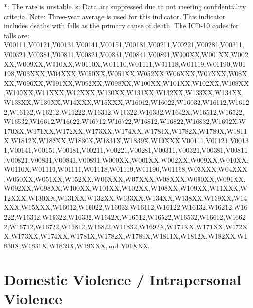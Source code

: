 \documentclass[
  english,
  letterpaper,
]{report}
\begin{document}
\begin{tcolorbox}[enhanced jigsaw, breakable, leftrule=.75mm, title=\textcolor{quarto-callout-note-color}{\faInfo}\hspace{0.5em}{Note}, bottomrule=.15mm, opacityback=0, left=2mm, colback=white, bottomtitle=1mm, coltitle=black, colbacktitle=quarto-callout-note-color!10!white, colframe=quarto-callout-note-color-frame, opacitybacktitle=0.6, toptitle=1mm, titlerule=0mm, arc=.35mm, rightrule=.15mm, toprule=.15mm]

*: The rate is unstable. s: Data are suppressed due to not meeting
confidentiality criteria. Note: Three-year average is used for this
indicator. This indicator includes deaths with falls as the primary
cause of death. The ICD-10 codes for falls are:
V00111,V00121,V00131,V00141,V00151,V00181,V00211,V00221,V00281,V00311,V00321,V00381,V00811,V00821,V00831,V00841,V00891,W000XX,W001XX,W002XX,W009XX,W010XX,W0110X,W01110,W01111,W01118,W01119,W01190,W01198,W03XXX,W04XXX,W050XX,W051XX,W052XX,W06XXX,W07XXX,W08XXX,W090XX,W091XX,W092XX,W098XX,W100XX,W101XX,W102XX,W108XX,W109XX,W11XXX,W12XXX,W130XX,W131XX,W132XX,W133XX,W134XX,W138XX,W139XX,W14XXX,W15XXX,W16012,W16022,W16032,W16112,W16122,W16132,W16212,W16222,W16312,W16322,W16332,W1642X,W16512,W16522,W16532,W16612,W16622,W16712,W16722,W16812,W16822,W16832,W1692X,W170XX,W171XX,W172XX,W173XX,W174XX,W1781X,W1782X,W1789X,W1811X,W1812X,W182XX,W1830X,W1831X,W1839X,W19XXX.V00111,V00121,V00131,V00141,V00151,V00181,V00211,V00221,V00281,V00311,V00321,V00381,V00811,V00821,V00831,V00841,V00891,W000XX,W001XX,W002XX,W009XX,W010XX,W0110X,W01110,W01111,W01118,W01119,W01190,W01198,W03XXX,W04XXX,W050XX,W051XX,W052XX,W06XXX,W07XXX,W08XXX,W090XX,W091XX,W092XX,W098XX,W100XX,W101XX,W102XX,W108XX,W109XX,W11XXX,W12XXX,W130XX,W131XX,W132XX,W133XX,W134XX,W138XX,W139XX,W14XXX,W15XXX,W16012,W16022,W16032,W16112,W16122,W16132,W16212,W16222,W16312,W16322,W16332,W1642X,W16512,W16522,W16532,W16612,W16622,W16712,W16722,W16812,W16822,W16832,W1692X,W170XX,W171XX,W172XX,W173XX,W174XX,W1781X,W1782X,W1789X,W1811X,W1812X,W182XX,W1830X,W1831X,W1839X,W19XXX,and
Y01XXX.

\end{tcolorbox}

\section{Domestic Violence / Intrapersonal
Violence}\label{domestic-violence-intrapersonal-violence}
\end{document}
